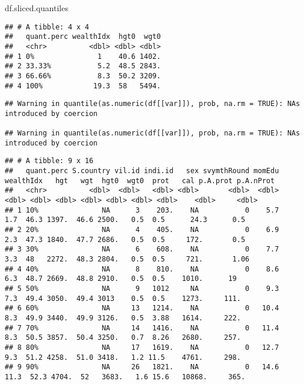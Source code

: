 \documentclass[
]{book}
\newenvironment{Shaded}{\begin{snugshade}}{\end{snugshade}}
\newcommand{\CommentTok}[1]{\textcolor[rgb]{0.56,0.35,0.01}{\textit{#1}}}
\newcommand{\DataTypeTok}[1]{\textcolor[rgb]{0.13,0.29,0.53}{#1}}
\newcommand{\FloatTok}[1]{\textcolor[rgb]{0.00,0.00,0.81}{#1}}
\newcommand{\KeywordTok}[1]{\textcolor[rgb]{0.13,0.29,0.53}{\textbf{#1}}}
\newcommand{\NormalTok}[1]{#1}
\newcommand{\OperatorTok}[1]{\textcolor[rgb]{0.81,0.36,0.00}{\textbf{#1}}}
\newcommand{\StringTok}[1]{\textcolor[rgb]{0.31,0.60,0.02}{#1}}
\begin{document}
\begin{Shaded}
\begin{Highlighting}[]
\NormalTok{df.sliced.quantiles}
\end{Highlighting}
\end{Shaded}

\begin{verbatim}
## # A tibble: 4 x 4
##   quant.perc wealthIdx  hgt0  wgt0
##   <chr>          <dbl> <dbl> <dbl>
## 1 0%               1    40.6 1402.
## 2 33.33%           5.2  48.5 2843.
## 3 66.66%           8.3  50.2 3209.
## 4 100%            19.3  58   5494.
\end{verbatim}

\begin{Shaded}
\end{Shaded}

\begin{verbatim}
## Warning in quantile(as.numeric(df[[var]]), prob, na.rm = TRUE): NAs introduced by coercion

## Warning in quantile(as.numeric(df[[var]]), prob, na.rm = TRUE): NAs introduced by coercion
\end{verbatim}

\begin{verbatim}
## # A tibble: 9 x 16
##   quant.perc S.country vil.id indi.id   sex svymthRound momEdu wealthIdx   hgt   wgt  hgt0  wgt0  prot   cal p.A.prot p.A.nProt
##   <chr>          <dbl>  <dbl>   <dbl> <dbl>       <dbl>  <dbl>     <dbl> <dbl> <dbl> <dbl> <dbl> <dbl> <dbl>    <dbl>     <dbl>
## 1 10%               NA      3    203.    NA           0    5.7       1.7  46.3 1397.  46.6 2500.   0.5  0.5      24.3      0.5 
## 2 20%               NA      4    405.    NA           0    6.9       2.3  47.3 1840.  47.7 2686.   0.5  0.5     172.       0.5 
## 3 30%               NA      6    608.    NA           0    7.7       3.3  48   2272.  48.3 2804.   0.5  0.5     721.       1.06
## 4 40%               NA      8    810.    NA           0    8.6       6.3  48.7 2669.  48.8 2910.   0.5  0.5    1010.      19   
## 5 50%               NA      9   1012     NA           0    9.3       7.3  49.4 3050.  49.4 3013    0.5  0.5    1273.     111.  
## 6 60%               NA     13   1214.    NA           0   10.4       8.3  49.9 3440.  49.9 3126.   0.5  3.88   1614.     222.  
## 7 70%               NA     14   1416.    NA           0   11.4       8.3  50.5 3857.  50.4 3250.   0.7  8.26   2680.     257.  
## 8 80%               NA     17   1619.    NA           0   12.7       9.3  51.2 4258.  51.0 3418.   1.2 11.5    4761.     298.  
## 9 90%               NA     26   1821.    NA           0   14.6      11.3  52.3 4704.  52   3683.   1.6 15.6   10868.     365.
\end{verbatim}
\end{document}
